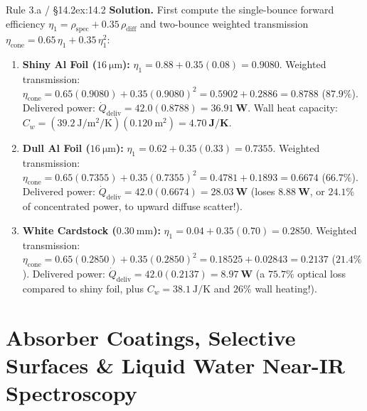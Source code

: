 \begin{workedexample}{Rule 3.a / §14.2}{ex:14.2}
\textbf{Solution.} First compute the single-bounce forward efficiency $\eta_1 = \rho_{\mathrm{spec}} + 0.35\,\rho_{\mathrm{diff}}$ and two-bounce weighted transmission $\eta_{\mathrm{cone}} = 0.65\,\eta_1 + 0.35\,\eta_1^2$:
\begin{enumerate}
  \item \textbf{Shiny Al Foil ($\SI{16}{\micro\meter}$):} $\eta_1 = 0.88 + 0.35(0.08) = 0.9080$. Weighted transmission: $\eta_{\mathrm{cone}} = 0.65(0.9080) + 0.35(0.9080)^2 = 0.5902 + 0.2886 = \mathbf{0.8788}$ ($87.9\%$). Delivered power: $\dot{Q}_{\mathrm{deliv}} = 42.0(0.8788) = \mathbf{\SI{36.91}{\watt}}$. Wall heat capacity: $C_w = (\SI{39.2}{\joule\per\square\meter\per\kelvin})(\SI{0.120}{\square\meter}) = \mathbf{\SI{4.70}{\joule\per\kelvin}}$.
  \item \textbf{Dull Al Foil ($\SI{16}{\micro\meter}$):} $\eta_1 = 0.62 + 0.35(0.33) = 0.7355$. Weighted transmission: $\eta_{\mathrm{cone}} = 0.65(0.7355) + 0.35(0.7355)^2 = 0.4781 + 0.1893 = \mathbf{0.6674}$ ($66.7\%$). Delivered power: $\dot{Q}_{\mathrm{deliv}} = 42.0(0.6674) = \mathbf{\SI{28.03}{\watt}}$ (loses $\mathbf{\SI{8.88}{\watt}}$, or $24.1\%$ of concentrated power, to upward diffuse scatter!).
  \item \textbf{White Cardstock ($\SI{0.30}{\milli\meter}$):} $\eta_1 = 0.04 + 0.35(0.70) = 0.2850$. Weighted transmission: $\eta_{\mathrm{cone}} = 0.65(0.2850) + 0.35(0.2850)^2 = 0.18525 + 0.02843 = \mathbf{0.2137}$ ($21.4\%$). Delivered power: $\dot{Q}_{\mathrm{deliv}} = 42.0(0.2137) = \mathbf{\SI{8.97}{\watt}}$ (a $75.7\%$ optical loss compared to shiny foil, plus $C_w = \SI{38.1}{\joule\per\kelvin}$ and $26\%$ wall heating!).
\end{enumerate}
\end{workedexample}

\section{Absorber Coatings, Selective Surfaces \& Liquid Water Near-IR Spectroscopy}\label{sec:14.3}

